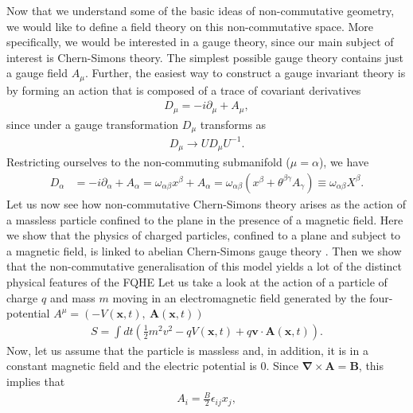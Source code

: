     Now that we understand some of the basic ideas of non-commutative geometry, we would like to define a field theory on this non-commutative space. More specifically, we would be interested in a gauge theory, since our main subject of interest is Chern-Simons theory. The simplest possible gauge theory contains just a gauge field $A_{\mu}$. Further, the easiest way to construct a gauge invariant theory is by forming an action that is composed of a trace of covariant derivatives 
    \begin{align}
        D_{\mu} = -i \partial_{\mu} + A_{\mu},
    \end{align}
    since under a gauge transformation $D_{\mu}$ transforms as
    \begin{align}
        D_{\mu} \rightarrow U D_{\mu} U^{-1}.
    \end{align}
    Restricting ourselves to the non-commuting submanifold ($\mu=\alpha$), we have
    \begin{align}
        D_{\alpha} &= -i \partial_{\alpha} + A_{\alpha} = \omega_{\alpha \beta}x^{\beta}+ A_{\alpha} = \omega_{\alpha \beta} \left( x^{\beta}+ \theta^{\beta \gamma} A_{\gamma} \right) \equiv \omega_{\alpha \beta} X^{\beta}.
    \end{align}
    Let us now see how non-commutative Chern-Simons theory arises as the action of a massless particle confined to the plane in the presence of a magnetic field.  Here we show that the physics of charged particles, confined to a plane and subject to a magnetic field, is linked to abelian Chern-Simons gauge theory \cite{Dunne1993, PhysRevD.41.661}. Then we show that the non-commutative generalisation of this model yields a lot of the distinct physical features of the FQHE \cite{Polychronakos:2001mi} Let us take a look at the action of a particle of charge $q$ and mass $m$ moving in an electromagnetic field generated by the four-potential $A^{\mu} = \left(-V(\bm{x}, t), \ \bm{A}(\bm{x},t)\right)$
    \begin{align}
        S = \int dt \left(\frac{1}{2} m^2 v^2 - q V(\bm{x},t) + q \bm{v} \cdot \bm{A}(\bm{x},t)\right). \label{eq:Lagrangian_Charged_Particle_In_EM_Field}
    \end{align}
    Now, let us assume that the particle is massless and, in addition, it is in a constant magnetic field and the electric potential is 0. Since $\bm{\nabla} \times \bm{A} = \bm{B}$, this implies that
    \begin{align}
        A_i = \frac{B}{2} \epsilon_{i j} x_j \label{eq:Gauge_Potential_Constant_B_Field},
    \end{align}

